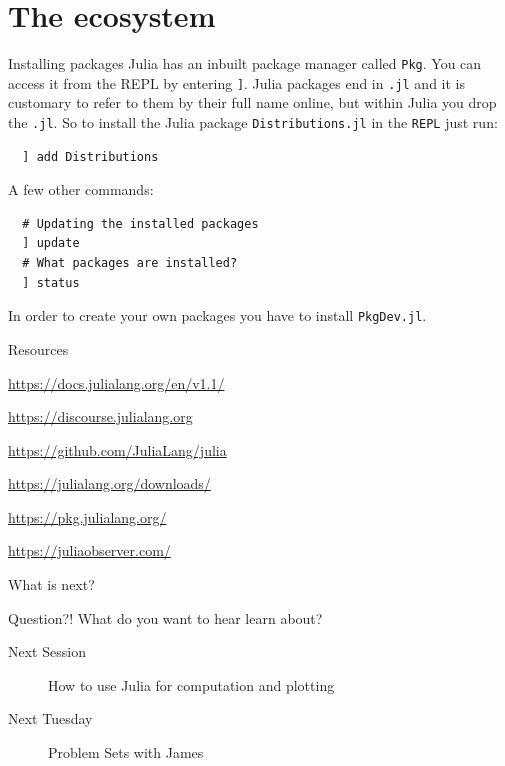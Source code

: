 \documentclass{beamer}
\begin{document}
\section{The ecosystem}
\begin{frame}[fragile]{Installing packages}
  Julia has an inbuilt package manager called \verb|Pkg|. You can access it from the REPL by entering \verb|]|. Julia packages end in \verb|.jl|
  and it is customary to refer to them by their full name online, but within Julia you drop the \verb|.jl|.
  So to install the Julia package \verb|Distributions.jl| in the \verb|REPL| just run:

  \begin{lstlisting}
  ] add Distributions
  \end{lstlisting}

  A few other commands:
  \begin{lstlisting}
  # Updating the installed packages
  ] update
  # What packages are installed?
  ] status
  \end{lstlisting}
  In order to create your own packages you have to install \verb|PkgDev.jl|.
\end{frame}
\begin{frame}{Resources}
\begin{description}
	\item[Documentation] \url{https://docs.julialang.org/en/v1.1/}
	\item[Forum] \url{https://discourse.julialang.org}
	\item[Issue Tracker] \url{https://github.com/JuliaLang/julia}
	\item[Downloads] \url{https://julialang.org/downloads/}
	\item[Packages] \url{https://pkg.julialang.org/}
	\item \url{https://juliaobserver.com/}
\end{description}
\end{frame}
\begin{frame}{What is next?}
  \begin{block}{Question?!}
    What do you want to hear learn about?
  \end{block}
  \begin{description}
    \item[Next Session] How to use Julia for computation and plotting
    \item[Next Tuesday] Problem Sets with James
  \end{description}
\end{frame}
\end{document}

